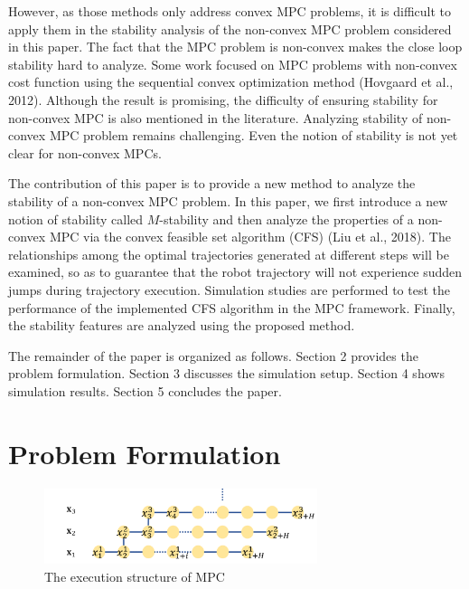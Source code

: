 \documentclass{ifacconf}
\begin{document}
However, as those methods only address convex MPC problems, it is difficult to apply them in the stability analysis of the non-convex MPC problem considered in this paper. The fact that the MPC problem is non-convex makes the close loop stability hard to analyze. Some work focused on MPC problems with non-convex cost function using the sequential convex optimization method (Hovgaard et al., 2012). Although the result is promising, the difficulty of ensuring stability for non-convex MPC is also mentioned in the literature. 
Analyzing stability of non-convex MPC problem remains challenging. Even the notion of stability is not yet clear for non-convex MPCs.


The contribution of this paper is to provide a new method to analyze the stability of a non-convex MPC problem. In this paper, we first introduce a new notion of stability called $M$-stability and then analyze the properties of a non-convex MPC via the convex feasible set algorithm (CFS) (Liu et al., 2018). The relationships among the optimal trajectories generated at different steps will be examined, so as to  guarantee that the robot trajectory will not experience sudden jumps during trajectory execution. Simulation studies are performed to test the performance of the implemented CFS  algorithm in the MPC framework. Finally, the stability features are analyzed using the proposed method.

The remainder of the paper is organized as follows. Section 2 provides the problem formulation. Section 3 discusses the simulation setup. Section 4 shows simulation results. Section 5 concludes the paper.

\section{Problem Formulation}

\begin{figure}[t]
\begin{center}
\includegraphics[width=8cm]{src/MPCstruc.png}
\caption{The execution structure of MPC}
\label{fig: mpc}
\end{center}
\end{figure}
\end{document}
